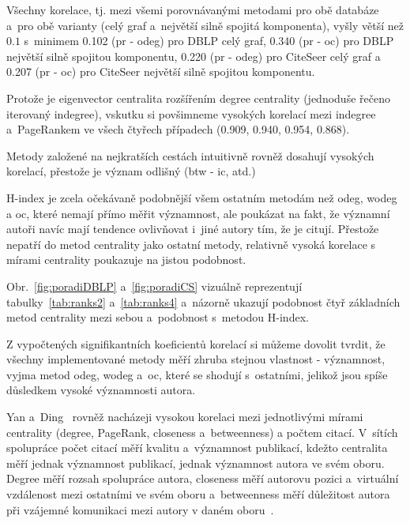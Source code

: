 \documentclass{bakalarka}
\begin{document}
Všechny korelace, tj. mezi všemi porovnávanými metodami pro obě databáze a~pro
obě varianty (celý graf a~největší silně spojitá komponenta), vyšly větší než
$0.1$ s~minimem 0.102 (pr - odeg) pro DBLP celý graf, 0.340 (pr - oc) pro DBLP
největší silně spojitou komponentu, 0.220 (pr - odeg) pro CiteSeer celý graf a
0.207 (pr - oc) pro CiteSeer největší silně spojitou komponentu.


Protože je eigenvector centralita rozšířením degree centrality (jednoduše
řečeno iterovaný indegree), vskutku si povšimneme vysokých korelací mezi
indegree a~PageRankem ve všech čtyřech případech (0.909, 0.940, 0.954, 0.868).

Metody založené na nejkratších cestách intuitivně rovněž dosahují vysokých
korelací, přestože je význam odlišný (btw - ic, atd.)

H-index je zcela očekávaně podobnější všem ostatním metodám než odeg, wodeg a
oc, které nemají přímo měřit významnost, ale poukázat na fakt, že významní
autoři navíc mají tendence ovlivňovat i~jiné autory tím, že je citují. Přestože
nepatří do metod centrality jako ostatní metody, relativně vysoká korelace s
mírami centrality poukazuje na jistou podobnost.

Obr.~\ref{fig:poradiDBLP} a~\ref{fig:poradiCS} vizuálně reprezentují
tabulky~\ref{tab:ranks2} a~\ref{tab:ranks4} a~názorně ukazují podobnost čtyř
základních metod centrality mezi sebou a~podobnost s~metodou H-index.


Z vypočtených signifikantních koeficientů korelací si můžeme dovolit tvrdit, že
všechny implementované metody měří zhruba stejnou vlastnost - významnost, vyjma
metod odeg, wodeg a~oc, které se shodují s~ostatními, jelikož jsou spíše
důsledkem vysoké významnosti autora. 

Yan a~Ding~\citep{yanding2009} rovněž nacházeji vysokou korelaci mezi
jednotlivými mírami centrality (degree, PageRank, closeness a~betweenness) a
počtem citací. V~sítích spolupráce počet citací měří kvalitu a~významnost
publikací, kdežto centralita měří jednak významnost publikací, jednak
významnost autora ve svém oboru. Degree měří rozsah spolupráce autora,
closeness měří autorovu pozici a~virtuální vzdálenost mezi ostatními ve svém
oboru a~betweenness měří důležitost autora při vzájemné komunikaci mezi autory
v daném oboru~\citep{yanding2009}.
\end{document}

